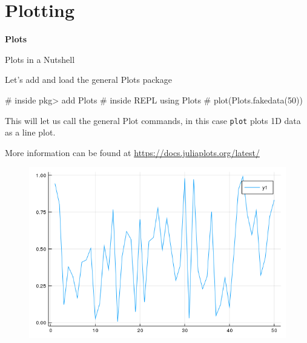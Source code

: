 \documentclass{beamer}
\newenvironment{Boxx}{\begin{tcolorbox}[standard jigsaw, opacityframe=0.8, opacityback=0.0,left=2pt,right=2pt,top=0pt,bottom=0pt]}{\end{tcolorbox}}
\begin{document}
\section{Plotting}

\begin{frame}[plain]

\centering \Huge \textbf{Plots}

\end{frame}


\begin{frame}[fragile]{Plots in a Nutshell}
	\begin{minipage}{0.6\linewidth}
			Let's add and load the general Plots package
		\begin{Boxx}
		\begin{jllisting}
					# inside pkg>
					add Plots
					# inside REPL
					using Plots
					# plot(Plots.fakedata(50))
			\end{jllisting}
		\end{Boxx}
		This will let us call the general Plot commands, in this case \verb|plot| plots 1D data as a line plot.
		
		More information can be found at \url{https://docs.juliaplots.org/latest/}
	\end{minipage}%
	\begin{minipage}{0.4\linewidth}
		\begin{figure}
			\centering
			\includegraphics[width=\textwidth]{images_data/randPlot}
		\end{figure}
	\end{minipage}
\end{frame}
\end{document}
